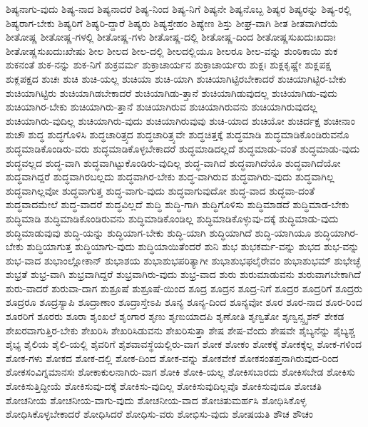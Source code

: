 {ಶಿಷ್ಯನಾಗು-ವುದು
ಶಿಷ್ಯ-ನಾದ
ಶಿಷ್ಯನಾದರೆ
ಶಿಷ್ಯ-ನಿಂದ
ಶಿಷ್ಯ-ನಿಗೆ
ಶಿಷ್ಯನೇ
ಶಿಷ್ಯನೊಬ್ಬ
ಶಿಷ್ಯರ
ಶಿಷ್ಯರನ್ನು
ಶಿಷ್ಯ-ರಲ್ಲಿ
ಶಿಷ್ಯರಾಗ-ಬೇಕು
ಶಿಷ್ಯರಿಗೆ
ಶಿಷ್ಯರಿ-ದ್ದಾರೆ
ಶಿಷ್ಯರು
ಶಿಷ್ಯಸ್ತೇಹಂ
ಶಿಷ್ಯೇಣ
ಶಿಸ್ತು
ಶೀಘ್ರ-ವಾಗಿ
ಶೀತ
ಶೀತವಾಗಿದೆಯೆ
ಶೀತೋಷ್ಣ
ಶೀತೋಷ್ಣ-ಗಳಲ್ಲಿ
ಶೀತೋಷ್ಣ-ಗಳು
ಶೀತೋಷ್ಣ-ದಲ್ಲಿ
ಶೀತೋಷ್ಣ-ದಿಂದ
ಶೀತೋಷ್ಣಸುಖದುಃಖದಾಃ
ಶೀತೋಷ್ಣಸುಖದುಃಖೇಷು
ಶೀಲ
ಶೀಲದ
ಶೀಲ-ದಲ್ಲಿ
ಶೀಲದಲ್ಲಿಯೂ
ಶೀಲರೂ
ಶೀಲ-ವನ್ನು
ಶುಂಠಿಕಾಯಿ
ಶುಕ
ಶುಕನಂತೆ
ಶುಕ-ನನ್ನು
ಶುಕ-ನಿಗೆ
ಶುಕ್ರವರ್ಮ
ಶುಕ್ರಾಚಾರ್ಯನ
ಶುಕ್ರಾಚಾರ್ಯರು
ಶುಕ್ಲಃ
ಶುಕ್ಲಕೃಷ್ಣೇ
ಶುಕ್ಲಪಕ್ಷ
ಶುಕ್ಲಪಕ್ಷದ
ಶುಚಃ
ಶುಚಿ
ಶುಚಿ-ಯಲ್ಲ
ಶುಚಿಯಾ
ಶುಚಿ-ಯಾಗಿ
ಶುಚಿಯಾಗಿಟ್ಟಿರಬೇಕಾದರೆ
ಶುಚಿಯಾಗಿಟ್ಟಿರ-ಬೇಕು
ಶುಚಿಯಾಗಿಟ್ಟಿರು
ಶುಚಿಯಾಗಿಡಬೇಕಾದರೆ
ಶುಚಿಯಾಗಿಡು-ತ್ತಾನೆ
ಶುಚಿಯಾಗಿಡುವುದಲ್ಲ
ಶುಚಿಯಾಗಿಡು-ವುದು
ಶುಚಿಯಾಗಿರ-ಬೇಕು
ಶುಚಿಯಾಗಿರು-ತ್ತಾನೆ
ಶುಚಿಯಾಗಿರುವ
ಶುಚಿಯಾಗಿರುವನು
ಶುಚಿಯಾಗಿರುವುದಲ್ಲ
ಶುಚಿಯಾಗಿರು-ವುದಿಲ್ಲ
ಶುಚಿಯಾಗಿರು-ವುದು
ಶುಚಿಯಾಗಿರುವುವು
ಶುಚಿ-ಯಾದ
ಶುಚಿಯೋ
ಶುಚಿರ್ದಕ್ಷ
ಶುಚೀನಾಂ
ಶುಚೌ
ಶುದ್ಧ
ಶುದ್ಧಗೊಳಿಸಿ
ಶುದ್ಧಚಾರಿತ್ರ್ಯದ
ಶುದ್ಧಚಾರಿತ್ರ್ಯವೇ
ಶುದ್ಧಚಿತ್ತಕ್ಕೆ
ಶುದ್ಧಮಾಡಿ
ಶುದ್ಧಮಾಡಿಕೊಂಡಿರುವನೊ
ಶುದ್ಧಮಾಡಿಕೊಂಡಿರು-ವರು
ಶುದ್ಧಮಾಡಿಕೊಳ್ಳಬೇಕಾದರೆ
ಶುದ್ಧಮಾಡಿದಲ್ಲದೆ
ಶುದ್ಧಮಾಡು-ವಂತೆ
ಶುದ್ಧಮಾಡು-ವುದು
ಶುದ್ಧವಲ್ಲದ
ಶುದ್ಧ-ವಾಗಿ
ಶುದ್ಧವಾಗಿಟ್ಟುಕೊಂಡಿರು-ವುದಿಲ್ಲ
ಶುದ್ಧ-ವಾಗಿದೆ
ಶುದ್ಧವಾಗಿದೆಯೊ
ಶುದ್ಧವಾಗಿದೆಯೋ
ಶುದ್ಧವಾಗಿದ್ದರೆ
ಶುದ್ಧವಾಗಿರಬಲ್ಲದು
ಶುದ್ಧವಾಗಿರ-ಬೇಕು
ಶುದ್ಧ-ವಾಗಿರುವ
ಶುದ್ಧವಾಗಿರು-ವುದು
ಶುದ್ಧವಾಗಿಲ್ಲ
ಶುದ್ಧವಾಗಿಲ್ಲವೋ
ಶುದ್ಧವಾಗುತ್ತ
ಶುದ್ಧ-ವಾಗು-ವುದು
ಶುದ್ಧವಾಗುವುದೋ
ಶುದ್ಧ-ವಾದ
ಶುದ್ಧವಾ-ದಂತೆ
ಶುದ್ಧವಾದಮೇಲೆ
ಶುದ್ಧ-ವಾದರೆ
ಶುದ್ಧವಿಲ್ಲದೆ
ಶುದ್ಧಿ
ಶುದ್ಧಿ-ಗಾಗಿ
ಶುದ್ಧಿಗೊಳಿಸು
ಶುದ್ಧಿಮಾಡದೆ
ಶುದ್ಧಿಮಾಡ-ಬೇಕು
ಶುದ್ಧಿಮಾಡಿ
ಶುದ್ಧಿಮಾಡಿಕೊಂಡಿರುವನು
ಶುದ್ಧಿಮಾಡಿಕೊಂಡಿಲ್ಲ
ಶುದ್ಧಿಮಾಡಿಕೊಳ್ಳುವು-ದಕ್ಕೆ
ಶುದ್ಧಿಮಾಡು-ವುದು
ಶುದ್ಧಿಮಾಡುವುವು
ಶುದ್ಧಿ-ಯನ್ನು
ಶುದ್ಧಿಯಾಗ-ಬೇಕು
ಶುದ್ಧಿ-ಯಾಗಿ
ಶುದ್ಧಿಯಾಗಿದೆ
ಶುದ್ಧಿ-ಯಾಗಿಯೂ
ಶುದ್ಧಿಯಾಗಿರ-ಬೇಕು
ಶುದ್ಧಿಯಾಗುತ್ತ
ಶುದ್ಧಿಯಾಗು-ವುದು
ಶುದ್ಧಿಯಾಯಿತೆಂದರೆ
ಶುನಿ
ಶುಭ
ಶುಭಕರ್ಮ-ವನ್ನು
ಶುಭದ
ಶುಭ-ವನ್ನು
ಶುಭ-ವಾದ
ಶುಭಾಂಲ್ಲೋಕಾನ್
ಶುಭಾಶಯ
ಶುಭಾಶುಭಪರಿತ್ಯಾಗೀ
ಶುಭಾಶುಭಫಲೈರೇವಂ
ಶುಭಾಶುಭಮ್
ಶುಭೇಚ್ಛೆ
ಶುಭ್ರತೆ
ಶುಭ್ರ-ವಾಗಿ
ಶುಭ್ರವಾಗಿದ್ದರೆ
ಶುಭ್ರವಾಗಿರು-ವುದು
ಶುಭ್ರ-ವಾದ
ಶುರು
ಶುರುಮಾಡುವನು
ಶುರುವಾಗಬೇಕಾಗಿದೆ
ಶುರು-ವಾದರೆ
ಶುರುವಾ-ದಾಗ
ಶುಶ್ರೂಷೆ
ಶುಶ್ರೂಷೆ-ಯಿಂದ
ಶೂದ್ರ
ಶೂದ್ರನ
ಶೂದ್ರ-ನಿಗೆ
ಶೂದ್ರರ
ಶೂದ್ರರಿಗೆ
ಶೂದ್ರರು
ಶೂದ್ರರೂ
ಶೂದ್ರಸ್ಯಾಪಿ
ಶೂದ್ರಾಣಾಂ
ಶೂದ್ರಾಸ್ತೇಽಪಿ
ಶೂನ್ಯ
ಶೂನ್ಯ-ದಿಂದ
ಶೂನ್ಯವೋ
ಶೂರ
ಶೂರ-ನಾದ
ಶೂರ-ರಿಂದ
ಶೂರರಿಗೆ
ಶೂರರು
ಶೂರಾ
ಶೃಂಖಲೆ
ಶೃಂಗಾರ
ಶೃಣು
ಶೃಣುಯಾದಪಿ
ಶೃಣೋತಿ
ಶೃಣ್ವತೋ
ಶೃಣ್ವನ್ಸ್ಪೃಶನ್
ಶೇಕಡ
ಶೇಖರವಾಗುತ್ತಿರ-ಬೇಕು
ಶೇಖರಿಸಿ
ಶೇಖರಿಸಿಡುವನು
ಶೇಖರಿಸುತ್ತಾ
ಶೇಷ
ಶೇಷ-ವೆಂದು
ಶೇಷವೇ
ಶೈಬ್ಯನೆನ್ನು
ಶೈಬ್ಯಶ್ಚ
ಶೈಭ್ಯ
ಶೈಲಿಯ
ಶೈಲಿ-ಯಲ್ಲಿ
ಶೈವರಿಗೆ
ಶೈಶವಾವಸ್ಥೆಯಲ್ಲಿರು-ವಾಗ
ಶೋಕ
ಶೋಕಂ
ಶೋಕಕ್ಕೆ
ಶೋಕಕ್ಕೆಲ್ಲ
ಶೋಕ-ಗಳಿಂದ
ಶೋಕ-ಗಳು
ಶೋಕದ
ಶೋಕ-ದಲ್ಲಿ
ಶೋಕ-ದಿಂದ
ಶೋಕ-ವನ್ನು
ಶೋಕವೇಕೆ
ಶೋಕಸಂತಪ್ತನಾಗಿರುವುದ-ರಿಂದ
ಶೋಕಸಂವಿಗ್ನಮಾನಸಃ
ಶೋಕಾಕುಲನಾಗಿರು-ವಾಗ
ಶೋಕಿ
ಶೋಕಿ-ಯಲ್ಲ
ಶೋಕಿಸಬಾರದು
ಶೋಕಿಸಬೇಡ
ಶೋಕಿಸು
ಶೋಕಿಸುತ್ತಿದ್ದೀಯೆ
ಶೋಕಿಸುವು-ದಕ್ಕೆ
ಶೋಕಿಸು-ವುದಿಲ್ಲ
ಶೋಕಿಸುವುದಿಲ್ಲವೊ
ಶೋಕಿಸುವುದೂ
ಶೋಚತಿ
ಶೋಚನೀಯ
ಶೋಚನೀಯ-ವಾಗು-ವುದು
ಶೋಚನೀಯ-ವಾದ
ಶೋಚಿತುಮರ್ಹಸಿ
ಶೋಧಿಸಿಕೊಳ್ಳ
ಶೋಧಿಸಿಕೊಳ್ಳಬೇಕಾದರೆ
ಶೋಧಿಸಿದರೆ
ಶೋಧಿಸು-ವರು
ಶೋಭಿಸು-ವುದು
ಶೋಷಯತಿ
ಶೌಚ
ಶೌಚಂ
}
